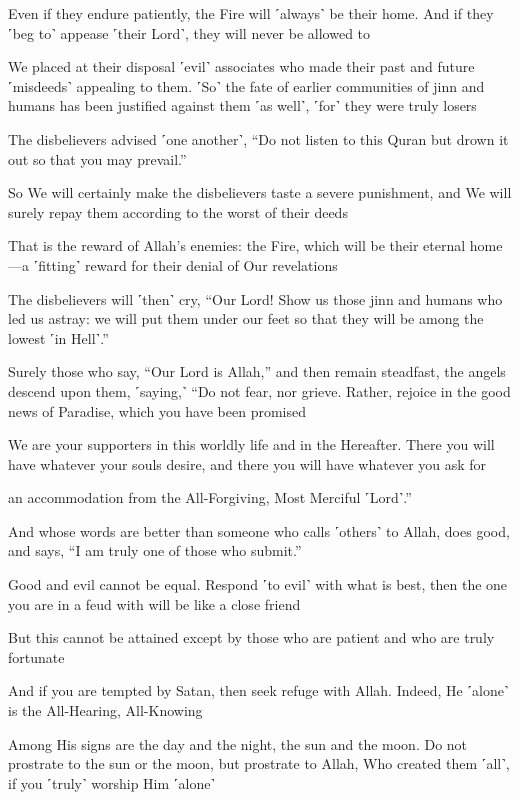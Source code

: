Even if they endure patiently, the Fire will ˹always˺ be their home. And if they ˹beg to˺ appease ˹their Lord˺, they will never be allowed to

We placed at their disposal ˹evil˺ associates who made their past and future ˹misdeeds˺ appealing to them. ˹So˺ the fate of earlier communities of jinn and humans has been justified against them ˹as well˺, ˹for˺ they were truly losers

The disbelievers advised ˹one another˺, “Do not listen to this Quran but drown it out so that you may prevail.”

So We will certainly make the disbelievers taste a severe punishment, and We will surely repay them according to the worst of their deeds

That is the reward of Allah’s enemies: the Fire, which will be their eternal home—a ˹fitting˺ reward for their denial of Our revelations

The disbelievers will ˹then˺ cry, “Our Lord! Show us those jinn and humans who led us astray: we will put them under our feet so that they will be among the lowest ˹in Hell˺.”

Surely those who say, “Our Lord is Allah,” and then remain steadfast, the angels descend upon them, ˹saying,˺ “Do not fear, nor grieve. Rather, rejoice in the good news of Paradise, which you have been promised

We are your supporters in this worldly life and in the Hereafter. There you will have whatever your souls desire, and there you will have whatever you ask for

an accommodation from the All-Forgiving, Most Merciful ˹Lord˺.”

And whose words are better than someone who calls ˹others˺ to Allah, does good, and says, “I am truly one of those who submit.”

Good and evil cannot be equal. Respond ˹to evil˺ with what is best, then the one you are in a feud with will be like a close friend

But this cannot be attained except by those who are patient and who are truly fortunate

And if you are tempted by Satan, then seek refuge with Allah. Indeed, He ˹alone˺ is the All-Hearing, All-Knowing

Among His signs are the day and the night, the sun and the moon. Do not prostrate to the sun or the moon, but prostrate to Allah, Who created them ˹all˺, if you ˹truly˺ worship Him ˹alone˺

